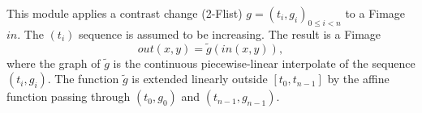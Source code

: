 This module applies a contrast change (2-Flist) $g=(t_i,g_i)_{0\leq i <n}$ 
to a Fimage $in$. The $(t_i)$ sequence is assumed to be increasing.
The result is a Fimage
$$out(x,y) = \tilde g(in(x,y)),$$
where the graph of $\tilde g$ is 
the continuous piecewise-linear interpolate of the sequence
$(t_i,g_i)$.
The function $\tilde g$ is 
extended linearly outside $[t_0,t_{n-1}]$ by the affine function
passing through $(t_0,g_0)$ and $(t_{n-1},g_{n-1})$.
